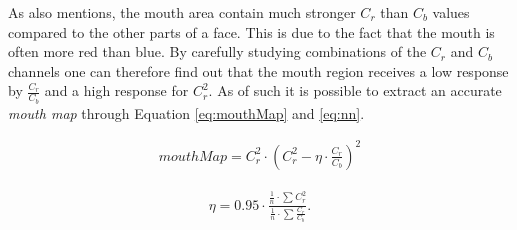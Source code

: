 
 As \cite{fdInColorImages} also mentions, the mouth area contain much stronger $C_{r}$ than $C_{b}$ values compared to the other parts of a face. This is due to the fact that the mouth is often more red than blue. By carefully studying combinations of the $C_{r}$ and $C_{b}$ channels one can therefore find out that the mouth region receives a low response by $\frac{C_{r}}{C_{b}}$ and a high response for $C_{r}^2$. As of such it is possible to extract an accurate \textit{mouth map} through Equation \ref{eq:mouthMap} and \ref{eq:nn}.


\begin{equation} \label{eq:mouthMap}
\begin{split}
mouthMap = C_r^2 \cdot (C_r^2 - \eta \cdot \frac{C_r}{C_b})^2
\end{split}
\end{equation}

\begin{equation} \label{eq:nn}
\begin{split}
\eta = 0.95 \cdot \frac{\frac{1}{n} \cdot \sum\limits_{} C_r^2}{\frac{1}{n} \cdot \sum\limits_{} \frac{C_r}{C_b}}.
\end{split}
\end{equation}







